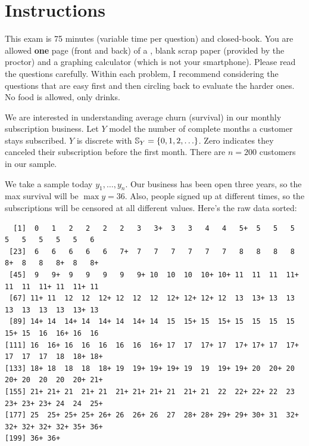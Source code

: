 \documentclass[12pt]{article}
\begin{document}
\section*{Instructions}
This exam is 75 minutes (variable time per question) and closed-book. You are allowed \textbf{one} page (front and back) of a , blank scrap paper (provided by the proctor) and a graphing calculator (which is not your smartphone). Please read the questions carefully. Within each problem, I recommend considering the questions that are easy first and then circling back to evaluate the harder ones. No food is allowed, only drinks. %

\pagebreak

\problem We are interested in understanding average churn (survival) in our monthly subscription business. Let $Y$ model the number of complete months a customer stays subscribed. $Y$ is discrete with $\mathbb{S}_{Y} = \left\{0, 1, 2, \ldots\right\}$. Zero indicates they canceled their subscription before the first month. There are $n=200$ customers in our sample.

We take a sample today $y_1, \ldots, y_n$. Our business has been open three years, so the max survival will be $\max{y} = 36$. Also, people signed up at different times, so the subscriptions will be censored at all different values. Here's the raw data sorted:

\footnotesize
\begin{verbatim}
  [1]  0   1   2   2   2   2   3   3+  3   3   4   4   5+  5   5   5   5   5   5   5   5   6 
 [23]  6   6   6   6   6   7+  7   7   7   7   7   7   8   8   8   8   8+  8   8   8+  8   8+
 [45]  9   9+  9   9   9   9   9+ 10  10  10  10+ 10+ 11  11  11  11+ 11  11  11+ 11  11+ 11 
 [67] 11+ 11  12  12  12+ 12  12  12  12+ 12+ 12+ 12  13  13+ 13  13  13  13  13  13  13+ 13 
 [89] 14+ 14  14+ 14  14+ 14  14+ 14  15  15+ 15  15+ 15  15  15  15  15+ 15  16  16+ 16  16 
[111] 16  16+ 16  16  16  16  16  16+ 17  17  17+ 17  17+ 17+ 17  17+ 17  17  17  18  18+ 18+
[133] 18+ 18  18  18  18+ 19  19+ 19+ 19+ 19  19  19+ 19+ 20  20+ 20  20+ 20  20  20  20+ 21+
[155] 21+ 21+ 21  21+ 21  21+ 21+ 21+ 21  21+ 21  22  22+ 22+ 22  23  23+ 23+ 23+ 24  24  25+
[177] 25  25+ 25+ 25+ 26+ 26  26+ 26  27  28+ 28+ 29+ 29+ 30+ 31  32+ 32+ 32+ 32+ 32+ 35+ 36+
[199] 36+ 36+
\end{verbatim}
\normalsize
\end{document}
